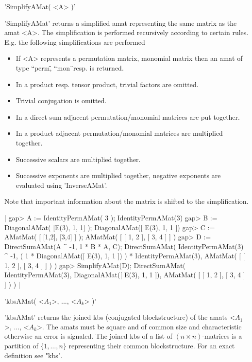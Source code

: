 'SimplifyAMat( <A> )'

'SimplifyAMat' returns a simplified amat representing the same matrix 
as the amat <A>. The simplification is performed recursively according 
to certain rules.
E.g. the following simplifications are performed\:\ 
\begin{itemize}
\item If <A> represents a permutation matrix, monomial matrix
then an amat of type ``perm\", ``mon\"\ resp. is returned.
\item In a product resp. tensor product, trivial factors
are omitted.
\item Trivial conjugation is omitted.
\item In a direct sum adjacent permutation/monomial matrices 
are put together.
\item In a product adjacent permutation/monomial matrices 
are multiplied together.
\item Successive scalars are multiplied together.
\item Successive exponents are multiplied together, negative 
exponents are evaluated using 'InverseAMat'.
\end{itemize}
Note that important information about the matrix is 
shifted to the simplification.

|    gap> A := IdentityPermAMat( 3 );
    IdentityPermAMat(3)
    gap> B := DiagonalAMat( [E(3), 1, 1] );
    DiagonalAMat([ E(3), 1, 1 ])
    gap> C := AMatMat( [ [1,2], [3,4] ] );
    AMatMat(
      [ [ 1, 2 ], [ 3, 4 ] ]
    )
    gap> D := DirectSumAMat(A ^ -1, 1 * B * A, C);
    DirectSumAMat(
      IdentityPermAMat(3) ^ -1,
      ( 1 * DiagonalAMat([ E(3), 1, 1 ])
      ) *
      IdentityPermAMat(3),
      AMatMat(
        [ [ 1, 2 ], [ 3, 4 ] ]
      )
    )
    gap> SimplifyAMat(D);
    DirectSumAMat(
      IdentityPermAMat(3),
      DiagonalAMat([ E(3), 1, 1 ]),
      AMatMat(
        [ [ 1, 2 ], [ 3, 4 ] ]
      )
    ) |

\Section{kbsAMat}

'kbsAMat( <$A_1$>, ..., <$A_k$> )'

'kbsAMat' returns the joined kbs (conjugated blockstructure) 
of the amats <$A_1$>, ..., <$A_k$>.
The amats must be square and of common size and characteristic 
otherwise an error is signaled. The joined kbs of a list of 
$(n\times n)$-matrices is a partition of $\{1,\dots,n\}$ representing their
common blockstructure. For an exact definition see "kbs".

